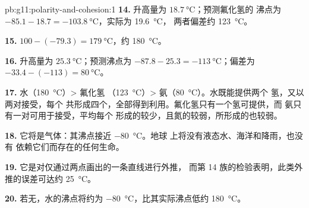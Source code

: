 \begin{solution}{pb:g11:polarity-and-cohesion:1}
\textbf{14.} 升高量为 $\qty{18.7}{\celsius}$；预测氟化氢的
沸点为 $-85.1 - 18.7 = \qty{-103.8}{\celsius}$，实际为 \qty{19.6}{\celsius}，
两者偏差约 \qty{123}{\celsius}。

\textbf{15.} $100 - (-79.3) = \qty{179}{\celsius}$，约
\qty{180}{\celsius}。

\textbf{16.} 升高量为 $\qty{25.3}{\celsius}$；预测沸点为 $-87.8 - 25.3 =
\qty{-113}{\celsius}$；偏差为 $-33.4 - (-113) = \qty{80}{\celsius}$。

\textbf{17.} 水（\qty{180}{\celsius}）> 氟化氢
（\qty{123}{\celsius}）> 氨（\qty{80}{\celsius}）。水既能提供两个
氢，又以两对接受，每个
共形成四个，全部得到利用。氟化氢只有一个氢可提供，而
氨只有一对可用于接受，平均每个
形成的较少，且氮的较弱，所形成的也较弱。

\textbf{18.} 它将是气体：其沸点接近 \qty{-80}{\celsius}。地球
上将没有液态水、海洋和降雨，也没有
依赖它们而存在的任何生命。

\textbf{19.} 它是对仅通过两点画出的一条直线进行外推，
而第 14 族的检验表明，此类外推的误差可达约
\qty{25}{\celsius}。

\textbf{20.} 若无，水的沸点将约为
\qty{-80}{\celsius}，比其实际沸点低约
\qty{180}{\celsius}。
\end{solution}
